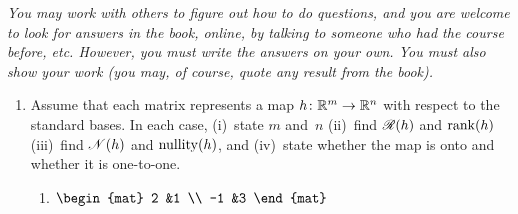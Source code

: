 \documentclass[11pt]{article}
\begin{document}
\thispagestyle{empty}

\vspace*{3ex}
\textit{You may work with others to figure out how to do questions, 
and you are welcome to look for answers in the book, online, by talking
to someone who had the course before, etc.
However, you must write 
the answers on your own.
You must also show your work (you may, of course, 
quote any result from the book).}

\begin{enumerate}
\item
  Assume that each matrix represents a map $\mbox{$h\colon \mathbb{R}^m\to \mathbb{R}^n$}$
  with respect to the standard bases.
  In each case, 
  (i)~state $m$ and~$n$
  (ii)~find $\mathscr{R}(h)$ and $\operatorname{rank}(h)$
  (iii)~find $\mathscr{N}(h)$ and $\operatorname{nullity}(h)$,
  and (iv)~state whether the map is onto and whether it is one-to-one.
  \begin{enumerate}
  \item
    $
    \begin{mat}
      2  &1  \\ 
      -1 &3
    \end{mat}
    $


\end{enumerate}
\end{enumerate}
\end{document}
